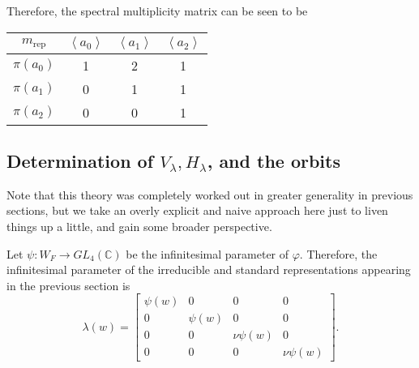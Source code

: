 \documentclass{memoir}
\newcommand{\la}{\left\langle}
\newcommand{\ra}{\right\rangle}
\newcommand{\bc}{\mathbb{C}}
\newcommand{\tx}{\text}
\newcommand{\vi}{\varphi}
\theoremstyle{definition}
\begin{document}
	Therefore, the spectral multiplicity matrix can be seen to be 
	\begin{center}
		\begin{tabular}{ c | c c c }
			$m_{\tx{rep}}$ & $\la a_0\ra$ & $\la a_1\ra$ & $\la a_2\ra$ \\
			\hline 
			$\pi(a_0)$ & 1 & 2 & 1 \\
			$\pi(a_1)$ & 0 & 1 & 1 \\
			$\pi(a_2)$ & 0 & 0 & 1
		\end{tabular}
	\end{center}
	
	\subsection{Determination of $V_\lambda, H_\lambda$, and the orbits}
	
	Note that this theory was completely worked out in greater generality in previous sections, but we take an overly explicit and naive approach here just to liven things up a little, and gain some broader perspective. 
	
	Let $\psi:W_F\to GL_4(\bc)$ be the infinitesimal parameter of $\vi$. 
	Therefore, the infinitesimal parameter of the irreducible and standard representations appearing in the previous section is 
	$$\lambda(w)=\begin{bmatrix}
		\psi(w) & 0 & 0 & 0 \\
		0 & \psi(w) & 0 & 0 \\
		0 & 0 & \nu\psi(w) & 0 \\
		0 & 0 & 0 & \nu\psi(w)
	\end{bmatrix}.$$
	
\end{document}
